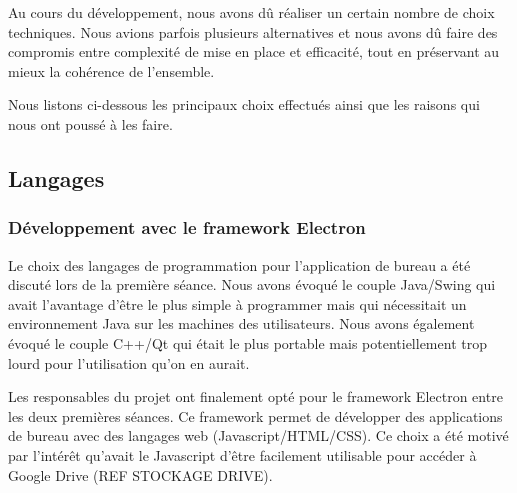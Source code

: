 \par
Au cours du développement, nous avons dû réaliser un certain nombre de choix techniques. Nous avions parfois plusieurs alternatives et nous avons dû faire des compromis entre complexité de mise en place et efficacité, tout en préservant au mieux la cohérence de l'ensemble.

\par Nous listons ci-dessous les principaux choix effectués ainsi que les raisons qui nous ont poussé à les faire.

\subsection{Langages}

\subsubsection{Développement avec le framework Electron}
\par
Le choix des langages de programmation pour l'application de bureau a été discuté lors de la première séance. Nous avons évoqué le couple Java/Swing qui avait l'avantage d'être le plus simple à programmer mais qui nécessitait un environnement Java sur les machines des utilisateurs. Nous avons également évoqué le couple C++/Qt qui était le plus portable mais potentiellement trop lourd pour l'utilisation qu'on en aurait. 
\par
Les responsables du projet ont finalement opté pour le framework Electron entre les deux premières séances. Ce framework permet de développer des applications de bureau avec des langages web (Javascript/HTML/CSS). Ce choix a été motivé par l'intérêt qu'avait le Javascript d'être facilement utilisable pour accéder à Google Drive (REF STOCKAGE DRIVE).

